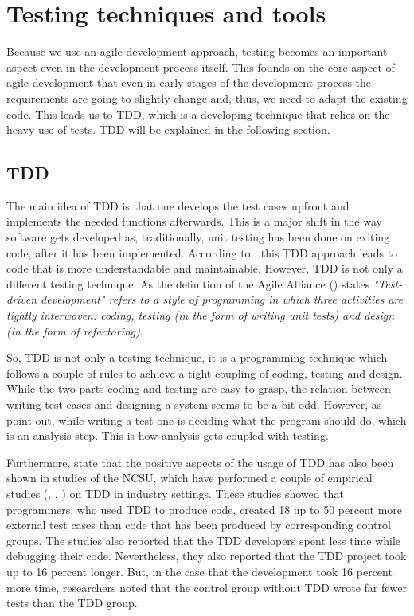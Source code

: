 \section{Testing techniques and tools}	
Because we use an agile development approach, testing becomes an important aspect even in the development process itself. This founds on the core aspect of agile development that even in early stages of the development process the requirements are going to slightly change and, thus, we need to adapt the existing code. This leads us to \ac{TDD}, which is a developing technique that relies on the heavy use of tests. \ac{TDD} will be explained in the following section. 

\subsection{TDD}
The main idea of \ac{TDD} is that one develops the test cases upfront and implements the needed functions afterwards. This is a major shift in the way software gets developed as, traditionally, unit testing has been done on exiting code, after it has been implemented. According to \cite{nerur2005}, this \ac{TDD} approach leads to code that is more understandable and maintainable. However, \ac{TDD} is not only a different testing technique. As the definition of the Agile Alliance (\cite{GAA2015}) states \textit{"Test-driven development" refers to a style of programming in which three activities are tightly interwoven: coding, testing (in the form of writing unit tests) and design (in the form of refactoring)}. 

So, \ac{TDD} is not only a testing technique, it is a programming technique which follows a couple of rules to achieve a tight coupling of coding, testing and design. While the two parts coding and testing are easy to grasp, the relation between writing test cases and designing a system seems to be a bit odd. However, as \cite{Janzen2005} point out, while writing a test one is deciding what the program should do, which is an analysis step. This is how analysis gets coupled with testing.

Furthermore, \cite{Janzen2005} state that the positive aspects of the usage of \ac{TDD} has also been shown in studies of the \ac{NCSU}, which have performed a couple of empirical studies (\cite{George2004}, \cite{max03}, \cite{Williams2003}) on TDD in industry settings.
These studies showed that programmers, who used \ac{TDD} to produce code, created 18 up to 50 percent more external test cases than code that has been produced by corresponding control groups. The studies also reported that the \ac{TDD} developers spent less time while debugging their code. Nevertheless, they also reported that the \ac{TDD} project took up to 16 percent longer. But, in the case that the development took 16 percent more time, researchers noted that the control group without \ac{TDD} wrote far fewer tests than the \ac{TDD} group. 

